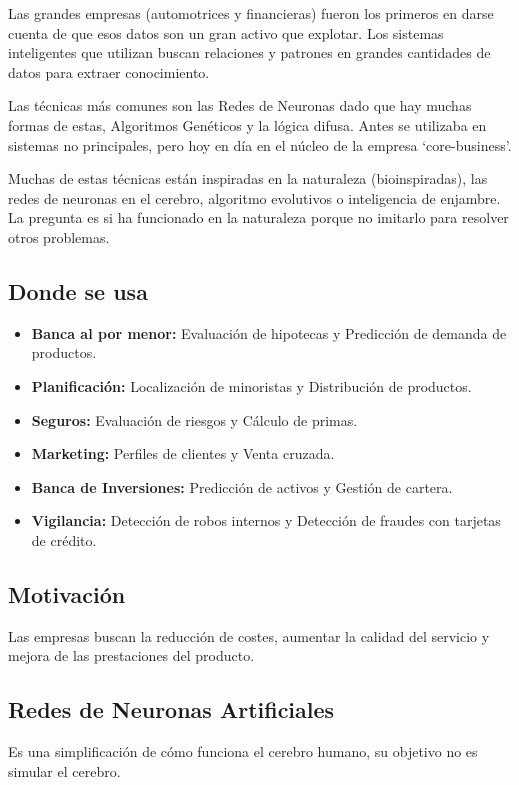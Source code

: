 \documentclass[12pt, twoside, openright]{report} %
\begin{document}
Las grandes empresas (automotrices y financieras) fueron los primeros en darse cuenta de que esos datos son un gran activo que explotar. Los sistemas inteligentes que utilizan buscan relaciones y patrones en grandes cantidades de datos para extraer conocimiento.

Las técnicas más comunes son las Redes de Neuronas dado que hay muchas formas de estas, Algoritmos Genéticos y la lógica difusa. Antes se utilizaba en sistemas no principales, pero hoy en día en el núcleo de la empresa ‘core-business’.

Muchas de estas técnicas están inspiradas en la naturaleza (bioinspiradas), las redes de neuronas en el cerebro, algoritmo evolutivos o inteligencia de enjambre. La pregunta es si ha funcionado en la naturaleza porque no imitarlo para resolver otros problemas.

\subsection{Donde se usa}
\begin{itemize}
	\item \textbf{Banca al por menor:} Evaluación de hipotecas y Predicción de demanda de productos.
	\item \textbf{Planificación:} Localización de minoristas y Distribución de productos.
	\item \textbf{Seguros:} Evaluación de riesgos y Cálculo de primas.
	\item \textbf{Marketing:} Perfiles de clientes y Venta cruzada.
	\item \textbf{Banca de Inversiones:} Predicción de activos y Gestión de cartera.
	\item \textbf{Vigilancia:} Detección de robos internos y Detección de fraudes con tarjetas de crédito.
\end{itemize}

\subsection{Motivación}
Las empresas buscan la reducción de costes, aumentar la calidad del servicio y mejora de las prestaciones del producto.

\subsection{Redes de Neuronas Artificiales}
Es una simplificación de cómo funciona el cerebro humano, su objetivo no es simular el cerebro.
\end{document}
